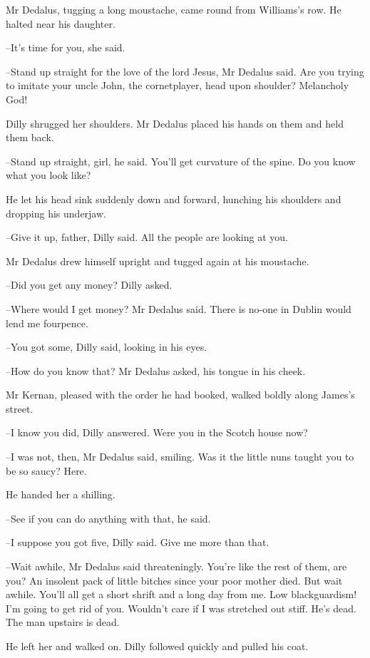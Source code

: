 Mr Dedalus, tugging a long moustache, came round from Williams's
row. He halted near his daughter.

--It's time for you, she said.

--Stand up straight for the love of the lord Jesus, Mr Dedalus said. Are
you trying to imitate your uncle John, the cornetplayer, head upon
shoulder? Melancholy God!

Dilly shrugged her shoulders.
Mr Dedalus placed his hands on them and held them back.

--Stand up straight, girl, he said. You'll get curvature of the spine.
Do you know what you look like?

He let his head sink suddenly down and forward, hunching his
shoulders and dropping his underjaw.

--Give it up, father, Dilly said. All the people are looking at you.

Mr Dedalus drew himself upright and tugged again at his moustache.

--Did you get any money? Dilly asked.

--Where would I get money?
Mr Dedalus said.
There is no-one in Dublin would lend me fourpence.%

--You got some, Dilly said, looking in his eyes.

--How do you know that? Mr Dedalus asked, his tongue in his cheek.

Mr Kernan, pleased with the order he had booked, walked boldly
along James's street.

--I know you did, Dilly answered. Were you in the Scotch house now?

--I was not, then, Mr Dedalus said, smiling. Was it the little nuns
taught you to be so saucy? Here.

He handed her a shilling.

--See if you can do anything with that, he said.

--I suppose you got five, Dilly said.
Give me more than that.

--Wait awhile, Mr Dedalus said threateningly. You're like the rest of
them, are you? An insolent pack of little bitches since your poor mother
died. But wait awhile. You'll all get a short shrift and a long day from
me. Low blackguardism! I'm going to get rid of you. Wouldn't care if I
was stretched out stiff. He's dead. The man upstairs is dead.

He left her and walked on. Dilly followed quickly and pulled his coat.

